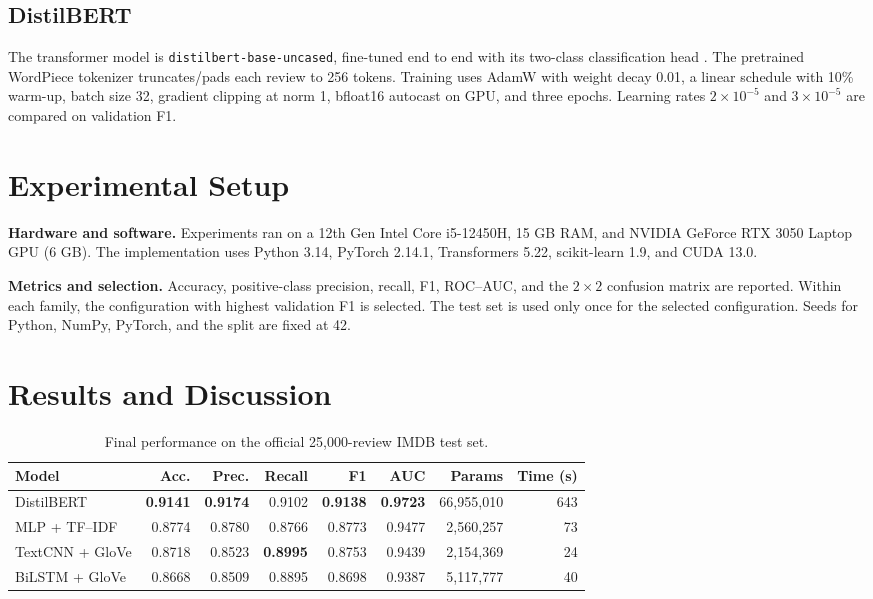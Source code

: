 \documentclass[12pt,a4paper]{article}
\begin{document}
\subsection{DistilBERT}
The transformer model is \texttt{distilbert-base-uncased}, fine-tuned end to end with its two-class classification head \cite{distilbert}. The pretrained WordPiece tokenizer truncates/pads each review to 256 tokens. Training uses AdamW with weight decay 0.01, a linear schedule with 10\% warm-up, batch size 32, gradient clipping at norm 1, bfloat16 autocast on GPU, and three epochs. Learning rates $2\times10^{-5}$ and $3\times10^{-5}$ are compared on validation F1.

\section{Experimental Setup}
\textbf{Hardware and software.} Experiments ran on a 12th Gen Intel Core i5-12450H, 15 GB RAM, and NVIDIA GeForce RTX 3050 Laptop GPU (6 GB). The implementation uses Python 3.14, PyTorch 2.14.1, Transformers 5.22, scikit-learn 1.9, and CUDA 13.0.

\textbf{Metrics and selection.} Accuracy, positive-class precision, recall, F1, ROC--AUC, and the $2\times2$ confusion matrix are reported. Within each family, the configuration with highest validation F1 is selected. The test set is used only once for the selected configuration. Seeds for Python, NumPy, PyTorch, and the split are fixed at 42.

\section{Results and Discussion}
\begin{table}[H]
\centering\small
\caption{Final performance on the official 25,000-review IMDB test set.}
\begin{tabular}{lrrrrrrr}
\toprule
Model & Acc. & Prec. & Recall & F1 & AUC & Params & Time (s)\\
\midrule
DistilBERT & \textbf{0.9141} & \textbf{0.9174} & 0.9102 & \textbf{0.9138} & \textbf{0.9723} & 66,955,010 & 643\\
MLP + TF--IDF & 0.8774 & 0.8780 & 0.8766 & 0.8773 & 0.9477 & 2,560,257 & 73\\
TextCNN + GloVe & 0.8718 & 0.8523 & \textbf{0.8995} & 0.8753 & 0.9439 & 2,154,369 & 24\\
BiLSTM + GloVe & 0.8668 & 0.8509 & 0.8895 & 0.8698 & 0.9387 & 5,117,777 & 40\\
\bottomrule
\end{tabular}
\end{table}
\end{document}
